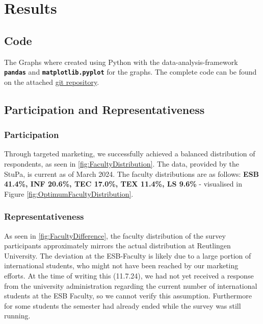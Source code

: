 \chapter{Results}



\section{Code}
The Graphs where created using Python with the data-analysis-framework \textbf{\texttt{pandas}} and \textbf{\texttt{matplotlib.pyplot}} for the graphs. The complete code can be found on the attached \href{https://github.com/frederikbeimgraben/Statistik-und-Biometrie-Praesentation}{git repository}.


\section{Participation and Representativeness}
\subsection{Participation}


\begin{multicols}{2}
    {
        
    } \columnbreak {
        
    }
\end{multicols}

Through targeted marketing, we successfully achieved a balanced distribution of respondents, as seen in \ref{fig:FacultyDistribution}.  
The  data, provided by the StuPa, is current as of March 2024. The faculty distributions are as follows: \textbf{ESB 41.4\%, INF 20.6\%, TEC 17.0\%, TEX 11.4\%, LS 9.6\%} - visualised in Figure \ref{fig:OptimumFacultyDistribution}.

\subsection{Representativeness}
\begin{multicols}{1}
    
    \columnbreak
    {
        As seen in \ref{fig:FacultyDifference}, the faculty distribution of the survey participants approximately mirrors the actual distribution at Reutlingen University.
        The deviation at the ESB-Faculty is likely due to a large portion of international students, who might not have been reached by our marketing efforts. At the time of writing this (11.7.24), we had not yet received a response from the university administration regarding the current number of international students at the ESB Faculty, so we cannot verify this assumption.
        Furthermore for some students the semester had already ended while the survey was still running.
    }
\end{multicols}

